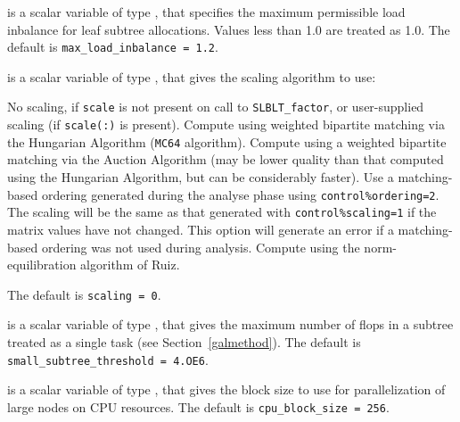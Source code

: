 \documentclass{galahad}
\newcommand{\packagename}{SLBLT}
\begin{document}
\begin{description}


is a scalar variable of type \realdp, that specifies the maximum permissible 
load inbalance for leaf subtree allocations. Values less than 1.0 are treated
as 1.0.
The default is {\tt max\_load\_inbalance = 1.2}.


is a scalar variable of type \integer,
that gives the scaling algorithm to use:
\begin{description}
 No scaling, if {\tt scale} is not present on call to
{\tt \packagename\_factor}, or user-supplied scaling (if
{\tt scale(:)} is present).
 Compute using weighted bipartite matching via the
Hungarian Algorithm ({\tt MC64} algorithm).
 Compute using a weighted bipartite matching via the
Auction Algorithm (may be lower quality than that
computed using the Hungarian Algorithm, but can be
considerably faster).
 Use a matching-based ordering generated during the
analyse phase using {\tt control\%ordering=2}. The scaling
will be the same as that generated with
{\tt control\%scaling=1} if the matrix values have not
changed. This option will generate an error if a
matching-based ordering was not used during analysis.
 Compute using the norm-equilibration algorithm of Ruiz.
\end{description}
The default is {\tt scaling = 0}.

is a scalar variable of type \longinteger, that gives the maximum number of
flops in a subtree treated as a single task (see Section~\ref{galmethod}).
The default is {\tt small\_subtree\_threshold = 4.OE6}.

is a scalar variable of type \integer,
that gives the block size to use for parallelization of large nodes on 
CPU resources.
The default is {\tt cpu\_block\_size = 256}.


\end{description}
\end{document}
